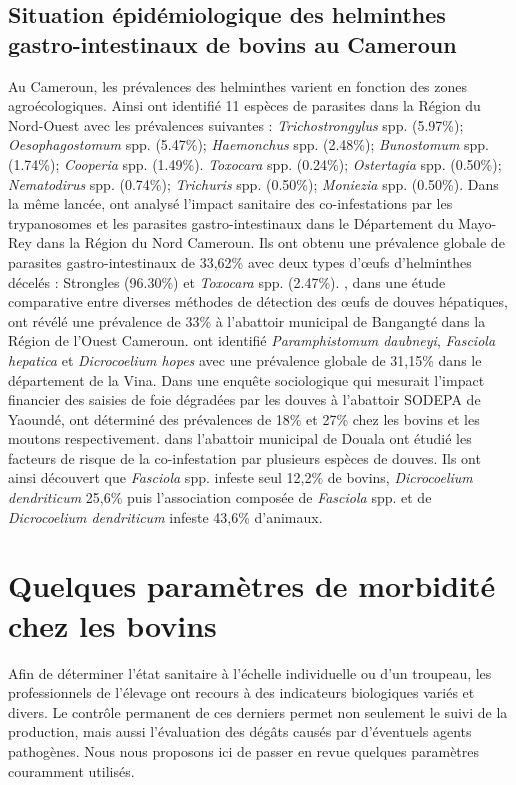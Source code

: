 \subsection{Situation épidémiologique des helminthes gastro-intestinaux de bovins au Cameroun}
Au Cameroun, les prévalences des helminthes varient en fonction des zones agroécologiques. 
Ainsi  ont identifié 11 espèces de parasites dans la Région du Nord-Ouest 
avec les prévalences suivantes : \textit{Trichostrongylus} spp. (5.97\%); 
\textit{Oesophagostomum} spp. (5.47\%); \textit{Haemonchus} spp. (2.48\%); \textit{Bunostomum} 
spp. (1.74\%); \textit{Cooperia} spp. (1.49\%). \textit{Toxocara} spp. (0.24\%); 
\textit{Ostertagia} spp. (0.50\%); \textit{Nematodirus} spp. (0.74\%); \textit{Trichuris} 
spp. (0.50\%); \textit{Moniezia} spp. (0.50\%). Dans la même lancée,  ont 
analysé l'impact sanitaire des co-infestations par les trypanosomes et les parasites 
gastro-intestinaux dans le Département du Mayo-Rey dans la Région du Nord Cameroun. Ils 
ont obtenu une prévalence globale de parasites gastro-intestinaux de 33,62\% avec deux 
types d'\oe ufs d'helminthes décelés : Strongles (96.30\%) et \textit{Toxocara} spp. 
(2.47\%).  , dans une étude comparative entre diverses méthodes de 
détection des \oe ufs de douves hépatiques, ont révélé une prévalence de 33\% à l'abattoir 
municipal de Bangangté dans la Région de l'Ouest Cameroun.  ont 
identifié \textit{Paramphistomum daubneyi}, \textit{Fasciola hepatica} et 
\textit{Dicrocoelium hopes} avec une prévalence globale de 31,15\% dans le département 
de la Vina. Dans une enquête sociologique qui mesurait l'impact financier des saisies 
de foie dégradées par les douves à l'abattoir SODEPA de Yaoundé,  
ont déterminé des prévalences de 18\% et 27\% chez les bovins et les moutons respectivement. 
 dans l'abattoir municipal de Douala ont étudié les facteurs de risque 
de la co-infestation par plusieurs espèces de douves. Ils ont ainsi découvert que 
\textit{Fasciola} spp. infeste seul 12,2\% de bovins, \textit{Dicrocoelium dendriticum} 
25,6\% puis l'association composée de \textit{Fasciola} spp. et de \textit{Dicrocoelium 
dendriticum} infeste 43,6\% d'animaux.

\section{Quelques paramètres de morbidité chez les bovins}
Afin de déterminer l'état sanitaire à l'échelle individuelle ou d'un troupeau, les 
professionnels de l'élevage ont recours à des indicateurs biologiques variés et divers. 
Le contrôle permanent de ces derniers permet non seulement le suivi de la production, 
mais aussi l'évaluation des dégâts causés par d'éventuels agents pathogènes.
Nous nous proposons ici de passer en revue quelques paramètres couramment utilisés.

